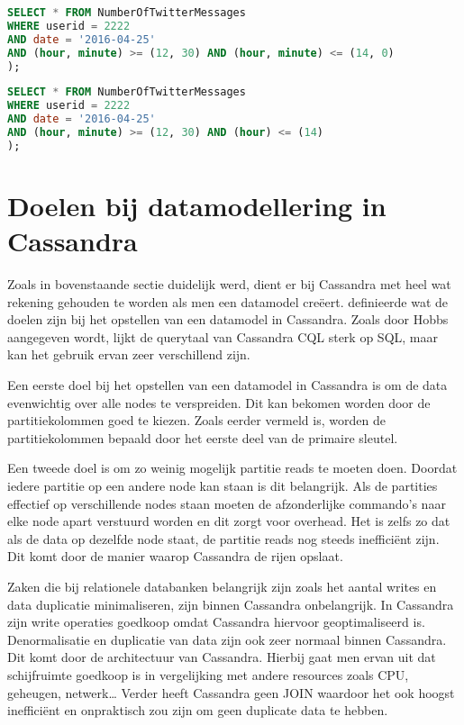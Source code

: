 \begin{lstlisting}[caption={Multi-column slice restrictie}, label={lst:queryMultiCol1}, language=SQL]
SELECT * FROM NumberOfTwitterMessages
WHERE userid = 2222
AND date = '2016-04-25'
AND (hour, minute) >= (12, 30) AND (hour, minute) <= (14, 0)
);
\end{lstlisting}

\begin{lstlisting}[caption={De restrictie moet starten met dezelfde kolom}, label={lst:queryMultiCol2}, language=SQL]
SELECT * FROM NumberOfTwitterMessages
WHERE userid = 2222
AND date = '2016-04-25'
AND (hour, minute) >= (12, 30) AND (hour) <= (14)
);
\end{lstlisting}

\section{Doelen bij datamodellering in Cassandra}
Zoals in bovenstaande sectie duidelijk werd, dient er bij Cassandra met heel wat rekening gehouden te worden als men een datamodel creëert.
\cite{Hobbs2015Datamodelling} definieerde wat de doelen zijn bij het opstellen van een datamodel in Cassandra.
Zoals door Hobbs aangegeven wordt, lijkt de querytaal van Cassandra CQL sterk op SQL, maar kan het gebruik ervan zeer verschillend zijn.

Een eerste doel bij het opstellen van een datamodel in Cassandra is om de data evenwichtig over alle nodes te verspreiden.
Dit kan bekomen worden door de partitiekolommen goed te kiezen.
Zoals eerder vermeld is, worden de partitiekolommen bepaald door het eerste deel van de primaire sleutel.

Een tweede doel is om zo weinig mogelijk partitie reads te moeten doen.
Doordat iedere partitie op een andere node kan staan is dit belangrijk.
Als de partities effectief op verschillende nodes staan moeten de afzonderlijke commando's naar elke node apart verstuurd worden en dit zorgt voor overhead.
Het is zelfs zo dat als de data op dezelfde node staat, de partitie reads nog steeds inefficiënt zijn.
Dit komt door de manier waarop Cassandra de rijen opslaat.

Zaken die bij relationele databanken belangrijk zijn zoals het aantal writes en data duplicatie minimaliseren, zijn binnen Cassandra onbelangrijk.
In Cassandra zijn write operaties goedkoop omdat Cassandra hiervoor geoptimaliseerd is.
Denormalisatie en duplicatie van data zijn ook zeer normaal binnen Cassandra.
Dit komt door de architectuur van Cassandra.
Hierbij gaat men ervan uit dat schijfruimte goedkoop is in vergelijking met andere resources zoals CPU, geheugen, netwerk\dots
Verder heeft Cassandra geen JOIN waardoor het ook hoogst inefficiënt en onpraktisch zou zijn om geen duplicate data te hebben.

